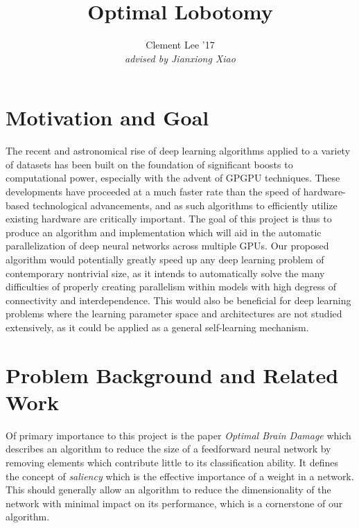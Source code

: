 \documentclass[11pt]{article}
\title{Optimal Lobotomy}
\author{Clement Lee '17\\\emph{advised by Jianxiong Xiao}}
\date{}
\begin{document}
\maketitle

\section{\textbf Motivation and Goal}
The recent and astronomical rise of deep learning algorithms applied to a variety of datasets has been built on the foundation of significant boosts to computational power, especially with the advent of GPGPU techniques.
These developments have proceeded at a much faster rate than the speed of hardware-based technological advancements, and as such algorithms to efficiently utilize existing hardware are critically important.
The goal of this project is thus to produce an algorithm and implementation which will aid in the automatic parallelization of deep neural networks across multiple GPUs.
Our proposed algorithm would potentially greatly speed up any deep learning problem of contemporary nontrivial size, as it intends to automatically solve the many difficulties of properly creating parallelism within models with high degress of connectivity and interdependence.
This would also be beneficial for deep learning problems where the learning parameter space and architectures are not studied extensively, as it could be applied as a general self-learning mechanism.

\section{Problem Background and Related Work}
Of primary importance to this project is the paper \emph{Optimal Brain Damage} \cite{lecun1989optimal} which describes an algorithm to reduce the size of a feedforward neural network by removing elements which contribute little to its classification ability.
It defines the concept of \emph{saliency} which is the effective importance of a weight in a network.
This should generally allow an algorithm to reduce the dimensionality of the network with minimal impact on its performance, which is a cornerstone of our algorithm.
\end{document}
